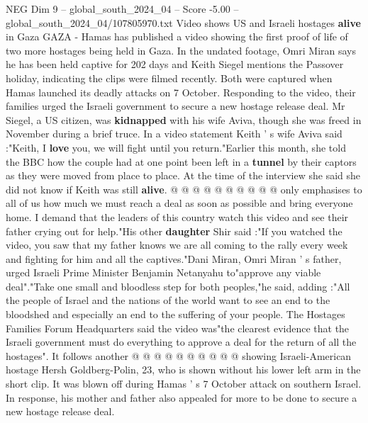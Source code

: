 \begin{textsample}{NEG Dim 9 – global\_south\_2024\_04 – Score -5.00 – global\_south\_2024\_04/107805970.txt}  \label{ex:f9_neg_326}
Video shows US and Israeli hostages \textbf{alive} in Gaza GAZA - Hamas has published a video showing the first proof of life of two more hostages being held in Gaza.
In the undated footage, Omri Miran says he has been held captive for 202 days and Keith Siegel mentions the Passover holiday, indicating the clips were filmed recently.
Both were captured when Hamas launched its deadly attacks on 7 October.
Responding to the video, their families urged the Israeli government to secure a new hostage release deal.
Mr Siegel, a US citizen, was \textbf{kidnapped} with his wife Aviva, though she was freed in November during a brief truce.
In a video statement Keith ' s wife Aviva said :"Keith, I \textbf{love} you, we will fight until you return."Earlier this month, she told the BBC how the couple had at one point been left in a \textbf{tunnel} by their captors as they were moved from place to place.
At the time of the interview she said she did not know if Keith was still \textbf{alive}. @ @ @ @ @ @ @ @ @ @ only emphasises to all of us how much we must reach a deal as soon as possible and bring everyone home.
I demand that the leaders of this country watch this video and see their father crying out for help."His other \textbf{daughter} Shir said :"If you watched the video, you saw that my father knows we are all coming to the rally every week and fighting for him and all the captives."Dani Miran, Omri Miran ' s father, urged Israeli Prime Minister Benjamin Netanyahu to"approve any viable deal"."Take one small and bloodless step for both peoples,"he said, adding :"All the people of Israel and the nations of the world want to see an end to the bloodshed and especially an end to the suffering of your people.
The Hostages Families Forum Headquarters said the video was"the clearest evidence that the Israeli government must do everything to approve a deal for the return of all the hostages".
It follows another @ @ @ @ @ @ @ @ @ @ showing Israeli-American hostage Hersh Goldberg-Polin, 23, who is shown without his lower left arm in the short clip.
It was blown off during Hamas ' s 7 October attack on southern Israel.
In response, his mother and father also appealed for more to be done to secure a new hostage release deal.

\end{textsample}
